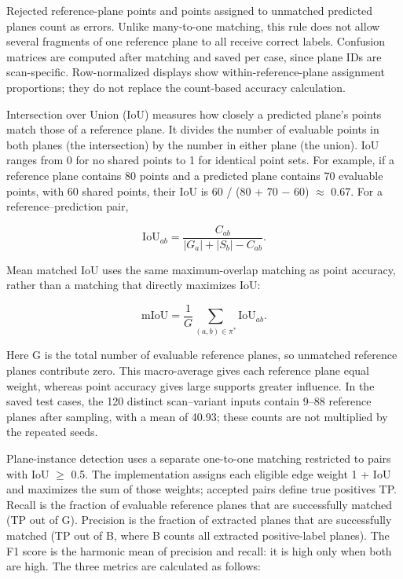 Rejected reference-plane points and points assigned to unmatched predicted planes count as errors. Unlike many-to-one matching, this rule does not allow several fragments of one reference plane to all receive correct labels. Confusion matrices are computed after matching and saved per case, since plane IDs are scan-specific. Row-normalized displays show within-reference-plane assignment proportions; they do not replace the count-based accuracy calculation.

Intersection over Union (IoU) measures how closely a predicted plane's points match those of a reference plane. It divides the number of evaluable points in both planes (the intersection) by the number in either plane (the union). IoU ranges from 0 for no shared points to 1 for identical point sets. For example, if a reference plane contains 80 points and a predicted plane contains 70 evaluable points, with 60 shared points, their IoU is 60 / (80 + 70 \(-\) 60) \(\approx\) 0.67. For a reference--prediction pair,

\begin{equation}
\mathrm{IoU}_{ab}=\frac{C_{ab}}{|G_a|+|S_b|-C_{ab}}.
\label{eq:60}
\end{equation}

Mean matched IoU uses the same maximum-overlap matching as point accuracy, rather than a matching that directly maximizes IoU:

\begin{equation}
\mathrm{mIoU}=\frac1G\sum_{(a,b)\in\pi^*}\mathrm{IoU}_{ab}.
\label{eq:61}
\end{equation}

Here G is the total number of evaluable reference planes, so unmatched reference planes contribute zero. This macro-average gives each reference plane equal weight, whereas point accuracy gives large supports greater influence. In the saved test cases, the 120 distinct scan--variant inputs contain 9--88 reference planes after sampling, with a mean of 40.93; these counts are not multiplied by the repeated seeds.

Plane-instance detection uses a separate one-to-one matching restricted to pairs with IoU \(\geq\) 0.5. The implementation assigns each eligible edge weight 1 + IoU and maximizes the sum of those weights; accepted pairs define true positives TP. Recall is the fraction of evaluable reference planes that are successfully matched (TP out of G). Precision is the fraction of extracted planes that are successfully matched (TP out of B, where B counts all extracted positive-label planes). The F1 score is the harmonic mean of precision and recall: it is high only when both are high. The three metrics are calculated as follows:


